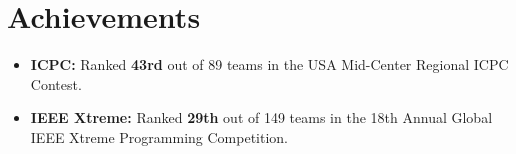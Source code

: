 \documentclass[10pt, letterpaper]{article}
\begin{document}
\section{Achievements}
\begin{itemize}
    \item \textbf{ICPC:} Ranked \textbf{43rd} out of 89 teams in the USA Mid-Center Regional ICPC Contest.
    \item \textbf{IEEE Xtreme:} Ranked \textbf{29th} out of 149 teams in the 18th Annual Global IEEE Xtreme Programming Competition.
\end{itemize}
\end{document}
